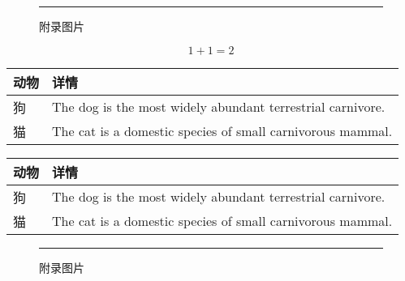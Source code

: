 \newpage %


\begin{figure}[h!]
	\centering\rule{1cm}{1cm}
	\caption{附录图片}
\end{figure}

\begin{equation}
	1+1=2
\end{equation}

\begin{table}[ht]
	\centering
	
	\label{tab:t1} %
	\begin{tabular}{lp{10cm}}
		\toprule
		动物 & 详情 \\
		\midrule
		狗    & The dog is the most widely abundant terrestrial carnivore. \\
		\addlinespace
		猫    & The cat is a domestic species of small carnivorous mammal.\\
		\bottomrule
	\end{tabular}
\end{table}

\begin{table}[ht]
	\centering
	
	\label{tab:t1} %
	\begin{tabular}{lp{10cm}}
		\toprule
		动物 & 详情 \\
		\midrule
		狗    & The dog is the most widely abundant terrestrial carnivore. \\
		\addlinespace
		猫    & The cat is a domestic species of small carnivorous mammal.\\
		\bottomrule
	\end{tabular}
\end{table}

\begin{figure}[h!]
	\centering\rule{1cm}{1cm}
	\caption{附录图片}
\end{figure}


\newpage


